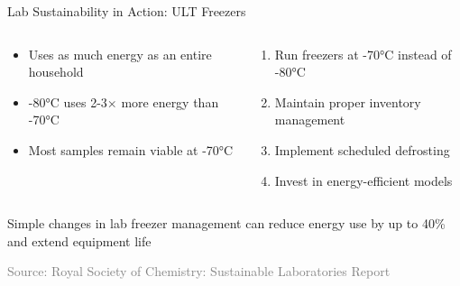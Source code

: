 \documentclass{beamer}
\newcommand{\source}[1]{\vspace{0.3cm}\hfill\scriptsize\textcolor{gray}{Source: #1}}
\newenvironment{actionblock}{\begin{tcolorbox}[colback=taskgreen!20, colframe=taskgreen, title=\textbf{Action Item}]}{\end{tcolorbox}}
\begin{document}
\begin{frame}{Lab Sustainability in Action: ULT Freezers}
\begin{columns}[T,onlytextwidth]
        \begin{tcolorbox}[title=\textbf{ULT Freezer Facts}, colback=tasklightblue!15, colframe=taskblue, fonttitle=\bfseries\color{white}]
            \begin{itemize}[itemsep=0.3em]
                \item Uses as much energy as an entire household
                \item -80°C uses 2-3× more energy than -70°C
                \item Most samples remain viable at -70°C
            \end{itemize}
        \end{tcolorbox}
        \vspace{0.3cm}
        \begin{tcolorbox}[title=\textbf{Recommendations}, colback=taskgreen!15, colframe=taskgreen, fonttitle=\bfseries\color{white}]
            \begin{enumerate}[itemsep=0.3em]
                \item Run freezers at -70°C instead of -80°C
                \item Maintain proper inventory management
                \item Implement scheduled defrosting
                \item Invest in energy-efficient models
            \end{enumerate}
        \end{tcolorbox}
    \end{columns}
    
    \begin{actionblock}
    Simple changes in lab freezer management can reduce energy use by up to 40\% and extend equipment life
    \end{actionblock}
    
    \source{Royal Society of Chemistry: Sustainable Laboratories Report \cite{rsc}}
\end{frame}
\end{document}
